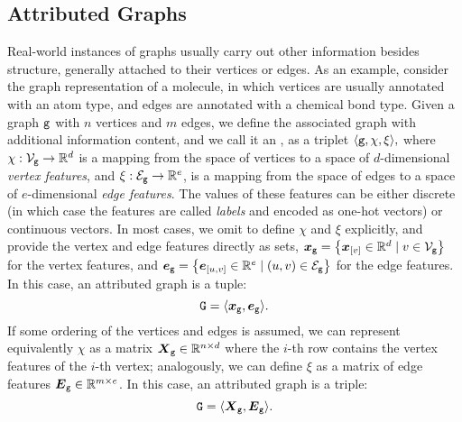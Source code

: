 \subsection{Attributed Graphs} \label{sec:attr-graphs}
Real-world instances of graphs usually carry out other information besides structure, generally attached to their vertices or edges. As an example, consider the graph representation of a molecule, in which vertices are usually annotated with an atom type, and edges are annotated with a chemical bond type. Given a graph $\mathtt{g}$ with $n$ vertices and $m$ edges, we define the associated graph with additional information content, and we call it an , as a triplet $\langle \mathtt{g}, \chi, \xi \rangle,$ where $\chi: \Nodes{g} \rightarrow \Real^d$ is a mapping from the space of vertices to a space of $d$-dimensional \emph{vertex features}, and $\xi: \Edges{g}\rightarrow \Real^{e}$, is a mapping from the space of edges to a space of $e$-dimensional \emph{edge features}. The values of these features can be either discrete (in which case the features are called \emph{labels} and encoded as one-hot vectors) or continuous vectors. In most cases, we omit to define $\chi$ and $\xi$ explicitly, and provide the vertex and edge features directly as sets, \eg $\Vector{x}_{\Graph{g}}= \Set{\Elem{x}{v} \in \Real^d \mid v \in \Nodes{g}}$ for the vertex features, and $\Vector{e}_{\Graph{g}} = \Set{\Elem{e}{u,v} \in \Real^e \mid (u, v) \in \Edges{g}}$ for the edge features. In this case, an attributed graph is a tuple:
$$\AttrGraph{g} = \VectorGraph{x}{g}.$$
If some ordering of the vertices and edges is assumed, we can represent equivalently $\chi$ as a matrix $\Matrix{X}_{\Graph{g}} \in \Real^{n \times d}$ where the $i$-th row contains the vertex features of the $i$-th vertex; analogously, we can define $\xi$ as a matrix of edge features $\Matrix{E}_{\Graph{g}} \in \Real^{m \times e}$. In this case, an attributed graph is a triple:
$$\AttrGraph{g} = \MatrixGraph{x}{g}.$$

